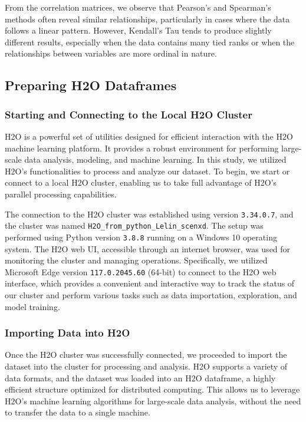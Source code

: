 \documentclass{llncs}
\begin{document}
From the correlation matrices, we observe that Pearson’s and Spearman’s methods often reveal similar relationships, particularly in cases where the data follows a linear pattern. However, Kendall’s Tau tends to produce slightly different results, especially when the data contains many tied ranks or when the relationships between variables are more ordinal in nature.

\subsection{Preparing H2O Dataframes}

\subsubsection{Starting and Connecting to the Local H2O Cluster}

H2O is a powerful set of utilities designed for efficient interaction with the H2O machine learning platform. It provides a robust environment for performing large-scale data analysis, modeling, and machine learning. In this study, we utilized H2O's functionalities to process and analyze our dataset. To begin, we start or connect to a local H2O cluster, enabling us to take full advantage of H2O's parallel processing capabilities.

The connection to the H2O cluster was established using version \texttt{3.34.0.7}, and the cluster was named \texttt{H2O\_from\_python\_Lelin\_scenxd}. The setup was performed using Python version \texttt{3.8.8} running on a Windows 10 operating system. The H2O web UI, accessible through an internet browser, was used for monitoring the cluster and managing operations. Specifically, we utilized Microsoft Edge version \texttt{117.0.2045.60} (64-bit) to connect to the H2O web interface, which provides a convenient and interactive way to track the status of our cluster and perform various tasks such as data importation, exploration, and model training.

\subsubsection{Importing Data into H2O}

Once the H2O cluster was successfully connected, we proceeded to import the dataset into the cluster for processing and analysis. H2O supports a variety of data formats, and the dataset was loaded into an H2O dataframe, a highly efficient structure optimized for distributed computing. This allows us to leverage H2O's machine learning algorithms for large-scale data analysis, without the need to transfer the data to a single machine.
\end{document}
